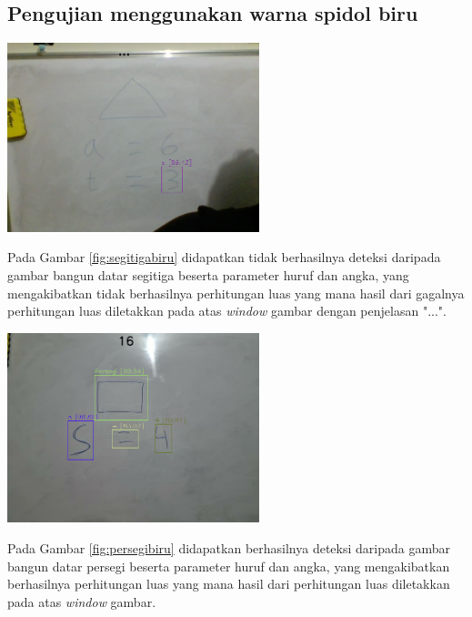 \subsection{Pengujian menggunakan warna spidol biru}
\begin{center}
	\includegraphics[width=0.55\textwidth]{gambar/segitiga biru.png}
	\label{fig:segitigabiru}
\end{center}
Pada Gambar \ref{fig:segitigabiru} didapatkan tidak berhasilnya deteksi daripada gambar bangun datar segitiga beserta parameter huruf dan angka, yang mengakibatkan tidak berhasilnya perhitungan luas yang mana hasil dari gagalnya perhitungan luas diletakkan pada atas \textit{window} gambar dengan penjelasan "...".

\begin{center}
	\includegraphics[width=0.55\textwidth]{gambar/persegi biru.png}
	\label{fig:persegibiru}
\end{center}
Pada Gambar \ref{fig:persegibiru} didapatkan berhasilnya deteksi daripada gambar bangun datar persegi beserta parameter huruf dan angka, yang mengakibatkan berhasilnya perhitungan luas yang mana hasil dari perhitungan luas diletakkan pada atas \textit{window} gambar.

